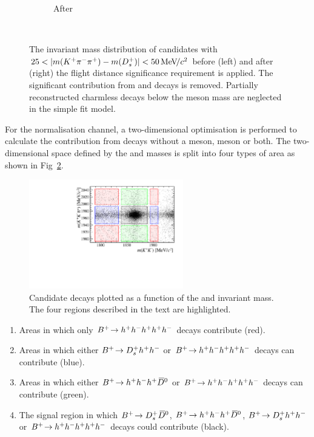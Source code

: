 \begin{figure}[!h]
\begin{subfigure}[t]{0.4\textwidth}
        \caption{After}
    \end{subfigure}\\
    \caption{The invariant mass distribution of \decay{\Bp}{(\decay{\Dsp}{\Kp\pim\pip})\phiz} candidates with $25 < |m({{K}^+}{{\pi}^-}{{\pi}^+}) - m({{D}^+_{s}})| < 50{\mathrm{\,Me\kern -0.1em V\!/}c^2} $ before (left) and after (right) the flight distance significance requirement is applied. The significant contribution from \decay{\Bp}{\Kp\pim\pip\phiz} and \decay{\Bp}{\Kp\pim\pip\Kp\Km} decays is removed. Partially reconstructed charmless decays below the \Bp meson mass are neglected in the simple fit model.}
    \label{fig:Selection_charmless_before_after}   
\end{figure}


For the \decay{\Bp}{\Dsp\Dzb} normalisation channel, a two-dimensional optimisation is performed to calculate the contribution from decays without a \Dsp meson, \Dzb meson or both. 
The two-dimensional space defined by the \Dsp and \Dzb masses is split into four types of area as shown in Fig~\ref{fig:2d_normalisation}.

\begin{figure}[!h]
    \centering
        \includegraphics[width=0.6\textwidth]{figs/Selection/B2DsD0_2D_mass_Ds2KKPiRun2.pdf}
        \caption{Candidate \decay{\Bp}{\Dsp\Dzb} decays plotted as a function of the \Dsp and \Dzb invariant mass. The four regions described in the text are highlighted.}
    \label{fig:2d_normalisation}   
\end{figure}

\begin{enumerate}
\item Areas in which only ${{{B}^+}}\!\rightarrow h^{+}h^{-}h^{+}h^{+}h^{-}$ decays contribute (red).
\item Areas in which either ${{{B}^+}}\!\rightarrow D_{s}^{+}h^{+}h^{-}$  or ${{{B}^+}}\!\rightarrow h^{+}h^{-}h^{+} h^{+}h^{-}$ decays can contribute (blue). 

\item Areas in which either ${{{B}^+}}\!\rightarrow h^{+}h^{-}h^{+}{{\kern 0.2em\overline{\kern -0.2em D}{}}{}^0}$ or ${{{B}^+}}\!\rightarrow h^{+}h^{-}h^{+} h^{+}h^{-}$ decays can contribute (green). 
\item The signal region in which ${{{B}^+}}\!\rightarrow D_{s}^{+} {{\kern 0.2em\overline{\kern -0.2em D}{}}{}^0}$, ${{{B}^+}}\!\rightarrow h^{+}h^{-}h^{+}{{\kern 0.2em\overline{\kern -0.2em D}{}}{}^0}$, ${{{B}^+}}\!\rightarrow D_{s}^{+}h^{+}h^{-}$ or ${{{B}^+}}\!\rightarrow h^{+}h^{-}h^{+}h^{+}h^{-}$ decays could contribute (black).
\end{enumerate}   

